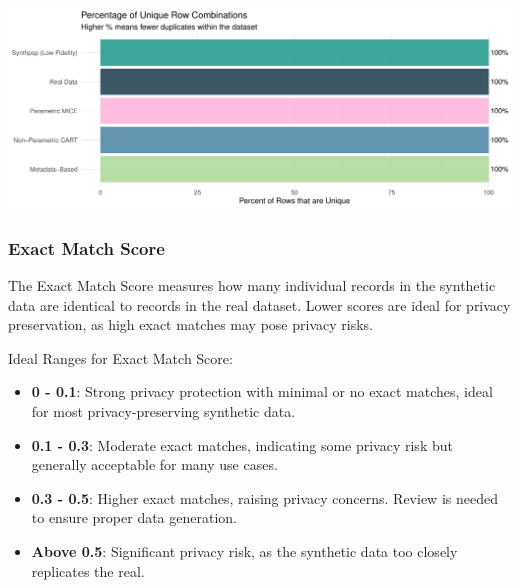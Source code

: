 \documentclass[
  letterpaper,
  DIV=11,
  numbers=noendperiod]{scrartcl}
\providecommand{\tightlist}{%
  \setlength{\itemsep}{0pt}\setlength{\parskip}{0pt}}\usepackage{longtable,booktabs,array}
\begin{document}
\begin{center}
\includegraphics[width=0.99\linewidth,height=\textheight,keepaspectratio]{heart_failure_synthetic_data_project_files/figure-pdf/Check for Unique Value Combinations-1.pdf}
\end{center}

\subsubsection{Exact Match Score}\label{exact-match-score}

The Exact Match Score measures how many individual records in the
synthetic data are identical to records in the real dataset. Lower
scores are ideal for privacy preservation, as high exact matches may
pose privacy risks.

Ideal Ranges for Exact Match Score:

\begin{itemize}
\tightlist
\item
  \textbf{0 - 0.1}: Strong privacy protection with minimal or no exact
  matches, ideal for most privacy-preserving synthetic data.
\item
  \textbf{0.1 - 0.3}: Moderate exact matches, indicating some privacy
  risk but generally acceptable for many use cases.
\item
  \textbf{0.3 - 0.5}: Higher exact matches, raising privacy concerns.
  Review is needed to ensure proper data generation.
\item
  \textbf{Above 0.5}: Significant privacy risk, as the synthetic data
  too closely replicates the real.
\end{itemize}
\end{document}
